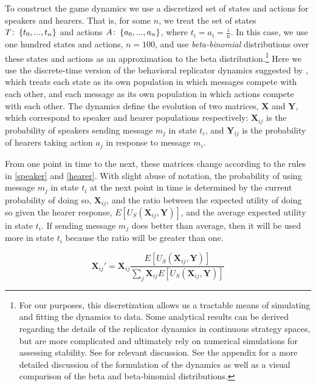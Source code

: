 \documentclass[linguex]{sp}
\theoremstyle{definition} \newtheorem{definition}{Definition}
\begin{document}
To construct the game dynamics we use a discretized set of states and actions for speakers and hearers. That is, for some $n$, we treat the set of states $T \colon\thinspace \{t_0, ..., t_n \}$ and actions $A \colon\thinspace \{a_0, ..., a_n \}$, where $t_i = a_i = \frac{i}{n}$. In this case, we use one hundred states and actions, $n=100$, and use \emph{beta-binomial} distributions over these states and actions as an approximation to the beta distribution.\footnote{For our purposes, this discretization allows us a tractable means of simulating and fitting the dynamics to data. Some analytical results can be derived regarding the  details of the replicator dynamics in continuous strategy spaces, but are more complicated  and ultimately rely on numerical simulations for assessing stability. See  \cite{oechssler2002,jager2011} for relevant discussion. See the appendix for a more detailed discussion of the formulation of the dynamics as well as a visual comparison of the beta and beta-binomial distributions.} Here we use the discrete-time version of the behavioral replicator dynamics suggested by \cite{hofbauer-huttegger2015}, which treats each state as its own population in which messages compete with each other, and each message as its own population in which actions compete with each other.  The dynamics define the evolution of two matrices, $\mathbf{X}$  and $\mathbf{Y}$,  which correspond to speaker and hearer populations respectively: $\mathbf{X}_{ij}$ is the probability of speakers sending message $m_j$ in state $t_i$, and $\mathbf{Y}_{ij}$ is the probability of hearers taking action $a_j$ in response to message $m_i$.

From one point in time to the next, these matrices change according to the rules in \eqref{speaker} and \eqref{hearer}. With slight abuse of notation, the probability of using message $m_j$ in state $t_i$ at the next point in time is determined by the current probability of doing so, $\mathbf{X}_{ij}$, and the ratio between the expected utility of doing so given the hearer response, $E[U_S(\mathbf{X}_{ij}, \mathbf{Y})]$, and the average expected utility in state $t_i$. If sending message $m_j$ does better than average, then it will be used more in state $t_i$ because the ratio will be greater than one.

\begin{equation}
     \mathbf{X}_{ij}' = \mathbf{X}_{ij}\frac{E[U_S(\mathbf{X}_{ij}, \mathbf{Y})]}{\sum_j \mathbf{X}_{ij} E[U_S(\mathbf{X}_{ij}, \mathbf{Y})]}
     \label{speaker}
\end{equation}
\end{document}
